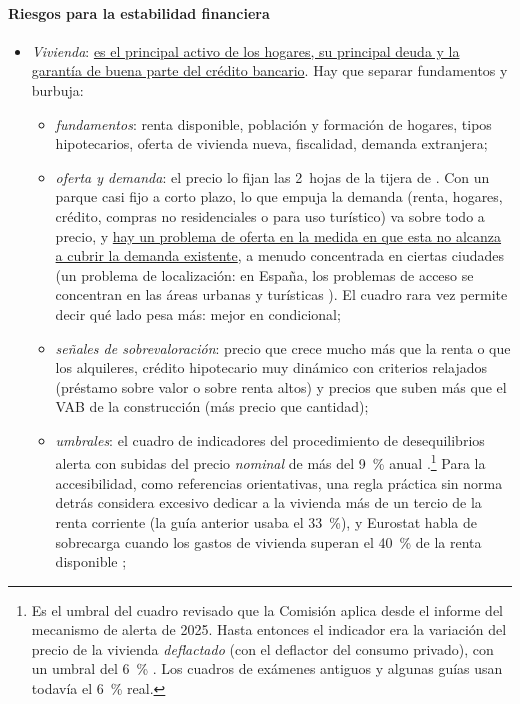 \documentclass[11pt]{article}
\begin{document}
\paragraph{Riesgos para la estabilidad financiera}
\begin{itemize}
\item \emph{Vivienda}: \uline{es el principal activo de los hogares, su principal deuda y la garantía de buena parte del crédito bancario}. Hay que separar fundamentos y burbuja:
  \begin{itemize}
  \item \emph{fundamentos}: renta disponible, población y formación de hogares, tipos hipotecarios, oferta de vivienda nueva, fiscalidad, demanda extranjera;
  \item \emph{oferta y demanda}: el precio lo fijan las 2~hojas de la tijera de . Con un parque casi fijo a corto plazo, lo que empuja la demanda (renta, hogares, crédito, compras no residenciales o para uso turístico) va sobre todo a precio, y \uline{hay un problema de oferta en la medida en que esta no alcanza a cubrir la demanda existente}, a menudo concentrada en ciertas ciudades (un problema de localización: en España, los problemas de acceso se concentran en las áreas urbanas y turísticas \parencite[págs.~232 y 242-243]{BdE2024Vivienda}). El cuadro rara vez permite decir qué lado pesa más: mejor en condicional;
  \item \emph{señales de sobrevaloración}: precio que crece mucho más que la renta o que los alquileres, crédito hipotecario muy dinámico con criterios relajados (préstamo sobre valor o sobre renta altos) y precios que suben más que el VAB de la construcción (más precio que cantidad);
  \item \emph{umbrales}: el cuadro de indicadores del procedimiento de desequilibrios alerta con subidas del precio \emph{nominal} de más del 9~\% anual \parencite{CE2025AMR2026}.\footnote{Es el umbral del cuadro revisado que la Comisión aplica desde el informe del mecanismo de alerta de 2025. Hasta entonces el indicador era la variación del precio de la vivienda \emph{deflactado} (con el deflactor del consumo privado), con un umbral del 6~\% \parencite{Eurostat2025MIP,CE2024AMR2025}. Los cuadros de exámenes antiguos y algunas guías usan todavía el 6~\% real.} Para la accesibilidad, como referencias orientativas, una regla práctica sin norma detrás considera excesivo dedicar a la vivienda más de un tercio de la renta corriente (la guía anterior usaba el 33~\%), y Eurostat habla de sobrecarga cuando los gastos de vivienda superan el 40~\% de la renta disponible \parencite{Eurostat2025Sobrecarga};

\end{itemize}
\end{itemize}
\end{document}
